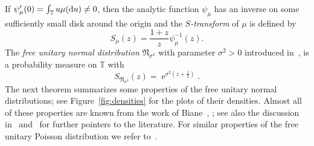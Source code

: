 \documentclass[AHL,Unicode,longabstracts,published]{cedram}
\DeclareMathOperator{\eee}{e}
\newcommand{\fnorm}{\mathfrak{N}}
\newcommand{\bT}{\mathbb{T}}
\newcommand*\dint{\text{\normalfont d}}
\begin{document}
If $\psi_\mu'(0) = \int_\bT u \mu(\dint u) \neq 0$, then the analytic function $\psi_\mu$ has an inverse on some sufficiently small disk around the origin and the \emph{$S$-transform} of $\mu$ is defined by
\begin{equation}\label{eq:S_transf_def}
S_\mu(z) = \frac {1+z}{z} \psi^{-1}_\mu(z).
\end{equation}
The \emph{free unitary normal distribution} $\fnorm_{\sigma^2}$ with parameter $\sigma^2>0$ introduced in~\cite[Lemmas~6.3]{bercovici_voiculescu_levy_hincin}, is a probability measure on $\bT$ with
\begin{equation}\label{eq:S_transf_normal}
S_{\fnorm_{\sigma^2}}(z) = \eee^{\sigma^2 \left(z + \frac 12\right)}.
\end{equation}
The next theorem summarizes some properties of the free unitary normal distributions; see Figure~\ref{fig:densities} for the plots of their densities. Almost all of these properties are known from the work of Biane~\cite{biane}, \cite[Proposition~10]{biane_segal_bargmann}; see also the discussion in~\cite[Proposition~2.24]{kemp} and~\cite[Remark~6.8]{levy_schur_weyl} for further pointers to the literature. For similar properties of the free unitary Poisson distribution we refer to~\cite[Section~5]{kabluchko_rep_diff_free_poi}.
\end{document}

